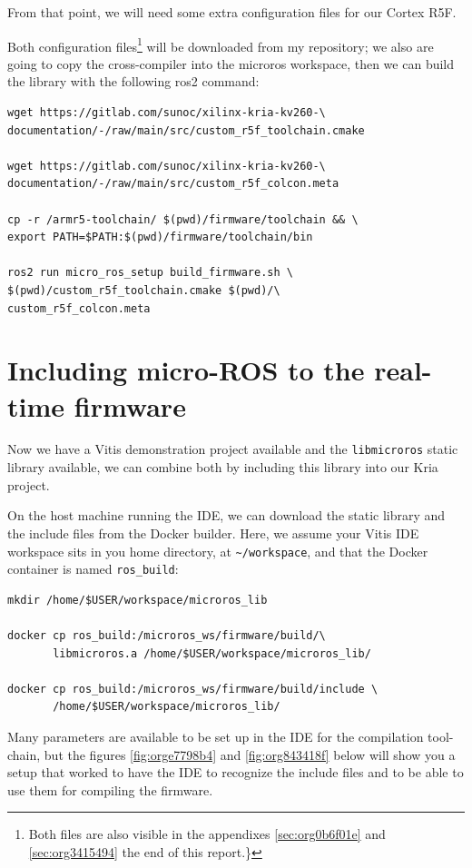\documentclass[10pt]{article}
\begin{document}
From that point, we will need some extra configuration files for our Cortex R5F.

Both configuration files\footnote{Both files are also visible in the appendixes \ref{sec:org0b6f01e}
and \ref{sec:org3415494} the end of this report.\}} will be downloaded from my repository;
we also are going to copy the cross-compiler into the microros workspace,
then we can build the library with the following ros2 command:
\begin{verbatim}
wget https://gitlab.com/sunoc/xilinx-kria-kv260-\
documentation/-/raw/main/src/custom_r5f_toolchain.cmake

wget https://gitlab.com/sunoc/xilinx-kria-kv260-\
documentation/-/raw/main/src/custom_r5f_colcon.meta

cp -r /armr5-toolchain/ $(pwd)/firmware/toolchain && \
export PATH=$PATH:$(pwd)/firmware/toolchain/bin

ros2 run micro_ros_setup build_firmware.sh \
$(pwd)/custom_r5f_toolchain.cmake $(pwd)/\
custom_r5f_colcon.meta
\end{verbatim}
\pagebreak

\section{Including micro-ROS to the real-time firmware}
\label{sec:orga4aefbc}
Now we have a Vitis demonstration project available and the \texttt{libmicroros} static library
available, we can combine both by including this library into our Kria project.

On the host machine running the IDE, we can download the static library
and the include files from the Docker builder.
Here, we assume your Vitis IDE workspace sits in you home directory, at \texttt{\textasciitilde{}/workspace},
and that the Docker container is named \texttt{ros\_build}:
\begin{verbatim}
mkdir /home/$USER/workspace/microros_lib

docker cp ros_build:/microros_ws/firmware/build/\
       libmicroros.a /home/$USER/workspace/microros_lib/

docker cp ros_build:/microros_ws/firmware/build/include \
       /home/$USER/workspace/microros_lib/
\end{verbatim}

Many parameters are available to be set up in the IDE for the compilation tool-chain, but
the figures \ref{fig:orge7798b4} and \ref{fig:org843418f} below will show you a setup that worked to have the IDE
to recognize the include files and to be able to use them for compiling the firmware.
\end{document}
